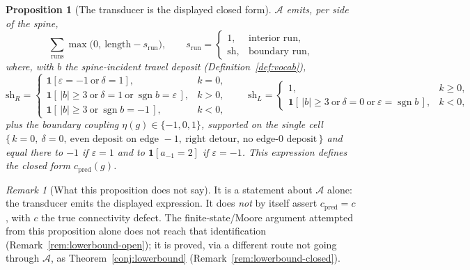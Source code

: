 \documentclass[11pt]{article}
\theoremstyle{plain}
\newtheorem{proposition}[theorem]{Proposition}
\theoremstyle{definition}
\theoremstyle{remark}
\newtheorem{remark}[theorem]{Remark}
\begin{document}
\begin{proposition}[The transducer is the displayed closed form]
\label{prop:Tform}
$\mathcal{A}$ emits, per side of the spine,
\[
\sum_{\text{runs}}\max\bigl(0,\ \text{length}-s_{\text{run}}\bigr),
\qquad
s_{\text{run}}=
\begin{cases}
1, & \text{interior run},\\
\mathrm{sh}, & \text{boundary run},
\end{cases}
\]
where, with $b$ the spine-incident travel deposit (Definition~\ref{def:vocab}),
\[
\mathrm{sh}_R=
\begin{cases}
\mathbf 1[\varepsilon=-1\ \text{or}\ \delta=1], & k=0,\\[2pt]
\mathbf 1[\,|b|\ge3\ \text{or}\ \delta=1\ \text{or}\
\operatorname{sgn}b=\varepsilon\,], & k>0,\\[2pt]
\mathbf 1[\,|b|\ge3\ \text{or}\ \operatorname{sgn}b=-1\,], & k<0,
\end{cases}
\qquad
\mathrm{sh}_L=
\begin{cases}
1, & k\ge0,\\[2pt]
\mathbf 1[\,|b|\ge3\ \text{or}\ \delta=0\ \text{or}\
\varepsilon=\operatorname{sgn}b\,], & k<0,
\end{cases}
\]
plus the boundary coupling $\eta(g)\in\{-1,0,1\}$, supported on the single cell
$\{\,k=0,\ \delta=0,\ \text{even deposit on edge }-1,\ \text{right detour, no
edge-}0\text{ deposit}\,\}$ and equal there to $-1$ if $\varepsilon=1$ and to
$\mathbf 1[a_{-1}=2]$ if $\varepsilon=-1$. This expression \emph{defines} the
closed form $c_{\mathrm{pred}}(g)$.
\end{proposition}

\begin{remark}[What this proposition does not say]
It is a statement about $\mathcal{A}$ alone: the transducer emits the displayed
expression. It does \emph{not} by itself assert $c_{\mathrm{pred}}=c$, with $c$
the true connectivity defect. The finite-state/Moore argument attempted from
this proposition alone does not reach that identification
(Remark~\textup{\ref{rem:lowerbound-open}}); it is proved, via a different
route not going through $\mathcal{A}$, as Theorem~\textup{\ref{conj:lowerbound}}
(Remark~\textup{\ref{rem:lowerbound-closed}}).
\end{remark}
\end{document}
